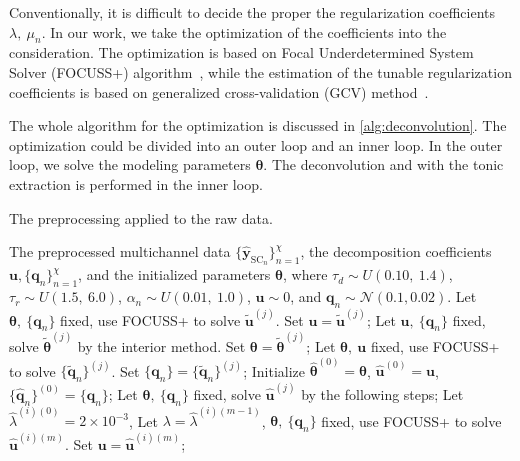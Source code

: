 \documentclass[]{article}
\begin{document}
Conventionally, it is difficult to decide the proper the regularization coefficients $\lambda,~\mu_n$. In our work, we take the optimization of the coefficients into the consideration. The optimization is based on Focal Underdetermined System Solver (FOCUSS+) algorithm~\cite{murray2005visual}, while the estimation of the tunable regularization coefficients is based on  generalized cross-validation (GCV) method~\cite{zdunek2008improved}. 

The whole algorithm for the optimization is discussed in \autoref{alg:deconvolution}. The optimization could be divided into an outer loop and an inner loop. In the outer loop, we solve the modeling parameters $\boldsymbol{\theta}$. The deconvolution and with the tonic extraction is performed in the inner loop.
\begin{algorithm}[!tb]
  \caption{The preprocessing applied to the raw data.}
  \label{alg:deconvolution}
  \begin{algorithmic}[1]
    \REQUIRE The preprocessed multichannel data $\{\hat{\mathbf{y}}_{\mathrm{SC}_n}\}_{n=1}^\chi$, the decomposition coefficients $\mathbf{u}, \{\mathbf{q}_{n}\}_{n=1}^\chi$, and the initialized parameters $\boldsymbol{\theta}$, where $\tau_d \sim U(0.10,~1.4)$, $\tau_r \sim U(1.5,~6.0)$, $\alpha_n \sim U(0.01,~1.0)$, $\mathbf{u} \sim 0$, and $\mathbf{q}_n \sim \mathcal{N}(0.1, 0.02)$.
      \STATE Let $\boldsymbol{\theta},~\{\mathbf{q}_{n}\}$ fixed, use FOCUSS+ to solve $\tilde{\mathbf{u}}^{(j)}$. Set $\mathbf{u} = \tilde{\mathbf{u}}^{(j)}$;
      \STATE Let $\mathbf{u},~\{\mathbf{q}_{n}\}$ fixed, solve $\tilde{\boldsymbol{\theta}}^{(j)}$ by the interior method. Set $\boldsymbol{\theta} = \tilde{\boldsymbol{\theta}}^{(j)}$;
      \STATE Let $\boldsymbol{\theta},~\mathbf{u}$ fixed, use FOCUSS+ to solve $\{\tilde{\mathbf{q}}_{n}\}^{(j)}$. Set $\{\mathbf{q}_{n}\} = \{\tilde{\mathbf{q}}_{n}\}^{(j)}$;
    \ENDFOR
    \STATE Initialize $\hat{\boldsymbol{\theta}}^{(0)}=\boldsymbol{\theta}$, $\hat{\mathbf{u}}^{(0)}=\mathbf{u}$, $\{\hat{\mathbf{q}}_{n}\}^{(0)}=\{\mathbf{q}_{n}\}$;
      \STATE Let $\boldsymbol{\theta},~\{\mathbf{q}_{n}\}$ fixed, solve $\hat{\mathbf{u}}^{(j)}$ by the following steps;
      \STATE Let $\hat{\lambda}^{(i)(0)} = 2 \times 10^{-3}$,
        \STATE Let $\lambda = \hat{\lambda}^{(i)(m-1)}$, $\boldsymbol{\theta},~\{\mathbf{q}_{n}\}$ fixed, use FOCUSS+ to solve $\hat{\mathbf{u}}^{(i)(m)}$. Set $\mathbf{u} = \hat{\mathbf{u}}^{(i)(m)}$;

\end{algorithmic}
\end{algorithm}
\end{document}

